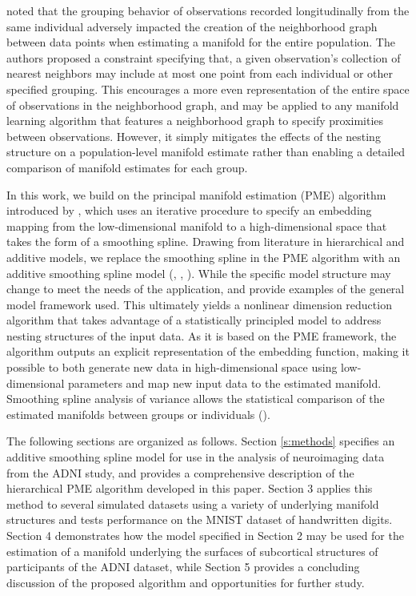 \documentclass[11pt,reqno]{article}
\theoremstyle{definition}
\begin{document}
\cite{guerreroGroupconstrainedManifoldLearning2017} noted that the grouping behavior of observations recorded longitudinally from the same individual adversely impacted the creation of the neighborhood graph between data points when estimating a manifold for the entire population. The authors proposed a constraint specifying that, a given observation's collection of nearest neighbors may include at most one point from each individual or other specified grouping. This encourages a more even representation of the entire space of observations in the neighborhood graph, and may be applied to any manifold learning algorithm that features a neighborhood graph to specify proximities between observations. However, it simply mitigates the effects of the nesting structure on a population-level manifold estimate rather than enabling a detailed comparison of manifold estimates for each group.

In this work, we build on the principal manifold estimation (PME) algorithm introduced by \cite{mengPrincipalManifoldEstimation2021}, which uses an iterative procedure to specify an embedding mapping from the low-dimensional manifold to a high-dimensional space that takes the form of a smoothing spline. Drawing from literature in hierarchical and additive models, we replace the smoothing spline in the PME algorithm with an additive smoothing spline model (\cite{gelmanDataAnalysisUsing2007}, \cite{hastieGeneralizedAdditiveModels1990}, \cite{gelmanBayesianDataAnalysis2014}). While the specific model structure may change to meet the needs of the application, \cite{brumbackSmoothingSplineModels1998} and \cite{schulamFrameworkIndividualizingPredictions2015a} provide examples of the general model framework used. This ultimately yields a nonlinear dimension reduction algorithm that takes advantage of a statistically principled model to address nesting structures of the input data. As it is based on the PME framework, the algorithm outputs an explicit representation of the embedding function, making it possible to both generate new data in high-dimensional space using low-dimensional parameters and map new input data to the estimated manifold. Smoothing spline analysis of variance allows the statistical comparison of the estimated manifolds between groups or individuals (\cite{wangMixedEffectsSmoothing1998}).

The following sections are organized as follows. Section \ref{s:methods} specifies an additive smoothing spline model for use in the analysis of neuroimaging data from the ADNI study, and provides a comprehensive description of the hierarchical PME algorithm developed in this paper. Section 3 applies this method to several simulated datasets using a variety of underlying manifold structures and tests performance on the MNIST dataset of handwritten digits. Section 4 demonstrates how the model specified in Section 2 may be used for the estimation of a manifold underlying the surfaces of subcortical structures of participants of the ADNI dataset, while Section 5 provides a concluding discussion of the proposed algorithm and opportunities for further study.
\end{document}
